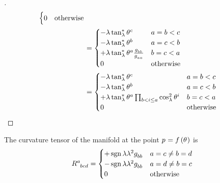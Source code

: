 \documentclass[../main.tex]{subfiles}
\begin{document}
\begin{proof}[]
\begin{align*}
\begin{cases}
0&\text{otherwise}\\
\end{cases}\\
&=\begin{cases}
-\lambda\tan_\lambda^\ast\tensor{\theta}{^c}&\text{\(a=b<c\)}\\
-\lambda\tan_\lambda^\ast\tensor{\theta}{^b}&\text{\(a=c<b\)}\\
+\lambda\tan_\lambda^\ast\tensor{\theta}{^a}\frac{\tensor{g}{_b_b}}{\tensor{g}{_a_a}}&\text{\(b=c<a\)}\\
0&\text{otherwise}\\
\end{cases}\\
&=\begin{cases}
-\lambda\tan_\lambda^\ast\tensor{\theta}{^c}&\text{\(a=b<c\)}\\
-\lambda\tan_\lambda^\ast\tensor{\theta}{^b}&\text{\(a=c<b\)}\\
+\lambda\tan_\lambda^\ast\tensor{\theta}{^a}\prod_{b<i\le a}{\cos_\lambda^2\tensor{\theta}{^i}}&\text{\(b=c<a\)}\\
0&\text{otherwise}\\
\end{cases}\qedhere
\end{align*}
\end{proof}
\begin{lemma}\label{M:CurvatureTensor}
The curvature tensor of the manifold
at the point \(\tensor{p}{}=f\left(\tensor{\theta}{}\right)\)
is
\[
\tensor{R}{^a_b_c_d}
=
\begin{cases}
+\sign{\lambda}\lambda^2\tensor{g}{_b_b}&\text{\(a=c\ne b=d\)}\\
-\sign{\lambda}\lambda^2\tensor{g}{_b_b}&\text{\(a=d\ne b=c\)}\\
0&\text{otherwise}\\
\end{cases}
\]
\end{lemma}
\end{document}
